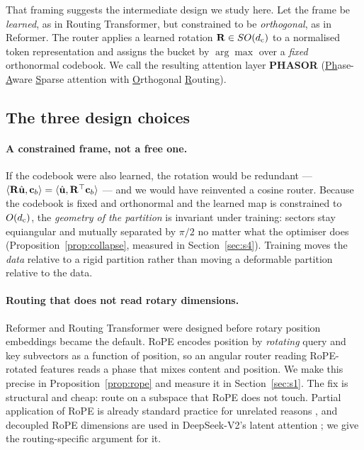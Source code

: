 That framing suggests the intermediate design we study here. Let the frame be \emph{learned}, as in Routing Transformer, but constrained to be \emph{orthogonal}, as in Reformer. The router applies a learned rotation $\mathbf{R} \in SO(d_{\mathrm{c}})$ to a normalised token representation and assigns the bucket by $\arg\max$ over a \emph{fixed} orthonormal codebook. We call the resulting attention layer \textbf{PHASOR} (\underline{Ph}ase-\underline{A}ware \underline{S}parse attention with \underline{O}rthogonal \underline{R}outing).

\subsection{The three design choices}

\paragraph{A constrained frame, not a free one.} If the codebook were also learned, the rotation would be redundant --- $\langle \mathbf{R}\hat{\mathbf{u}}, \mathbf{c}_b\rangle = \langle \hat{\mathbf{u}}, \mathbf{R}^\top \mathbf{c}_b\rangle$ --- and we would have reinvented a cosine router. Because the codebook is fixed and orthonormal and the learned map is constrained to $O(d_{\mathrm{c}})$, the \emph{geometry of the partition} is invariant under training: sectors stay equiangular and mutually separated by $\pi/2$ no matter what the optimiser does (Proposition~\ref{prop:collapse}, measured in Section~\ref{sec:s4}). Training moves the \emph{data} relative to a rigid partition rather than moving a deformable partition relative to the data.

\paragraph{Routing that does not read rotary dimensions.} Reformer and Routing Transformer were designed before rotary position embeddings \citep{su2024roformer} became the default. RoPE encodes position by \emph{rotating} query and key subvectors as a function of position, so an angular router reading RoPE-rotated features reads a phase that mixes content and position. We make this precise in Proposition~\ref{prop:rope} and measure it in Section~\ref{sec:s1}. The fix is structural and cheap: route on a subspace that RoPE does not touch. Partial application of RoPE is already standard practice for unrelated reasons \citep{black2022gptneox}, and decoupled RoPE dimensions are used in DeepSeek-V2's latent attention \citep{deepseekv2}; we give the routing-specific argument for it.

